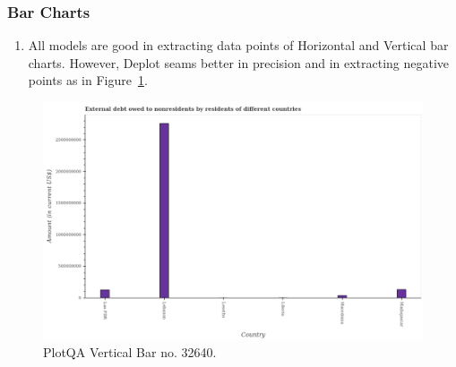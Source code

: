 \documentclass[
	letterpaper, %
]{jdf}
\begin{document}
\subsubsection{Bar Charts}\label{sssect:bar-errors}
\begin{enumerate}
    \item All models are good in extracting data points of Horizontal and Vertical bar charts.
        However, Deplot seams better in precision and in extracting negative points as in Figure~\ref{fig:plotqa-vbar-32640}.
       \end{enumerate}
       \begin{figure}
            \includegraphics{test-sample/plotqa/images/vertical-bar/32640.png}
            \caption{PlotQA Vertical Bar no. 32640.}
            \label{fig:plotqa-vbar-32640}
             \end{figure}
             
             
             
\end{document}
